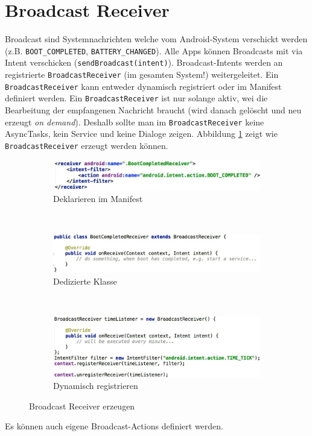 \section{Broadcast Receiver}

Broadcast sind Systemnachrichten welche vom Android-System verschickt werden (z.B. \texttt{BOOT\_COMPLETED}, \texttt{BATTERY\_CHANGED}). Alle Apps können Broadcasts mit via Intent verschicken (\texttt{sendBroadcast(intent)}). Broadcast-Intents werden an registrierte \texttt{BroadcastReceiver} (im gesamten System!) weitergeleitet. Ein \texttt{BroadcastReceiver} kann entweder dynamisch registriert oder im Manifest definiert werden. Ein \texttt{BroadcastReceiver} ist nur solange aktiv, wei die Bearbeitung der empfangenen Nachricht braucht (wird danach gelöscht und neu erzeugt \emph{on demand}). Deshalb sollte man im \texttt{BroadcastReceiver} keine AsyncTasks, kein Service und keine Dialoge zeigen. Abbildung \ref{fig:broadcast-receiver} zeigt wie \texttt{BroadcastReceiver} erzeugt werden können.

\begin{figure}
	\centering
	\begin{subfigure}[b]{0.48\textwidth}
		\includegraphics[width=\textwidth]{fig/broadcast-receiver-manifest}
		\caption{Deklarieren im Manifest}
	\end{subfigure}
	~
	\begin{subfigure}[b]{0.48\textwidth}
		\includegraphics[width=\textwidth]{fig/broadcast-receiver-manifest-klasse}
		\caption{Dedizierte Klasse}
	\end{subfigure}
	~
	\begin{subfigure}[b]{0.48\textwidth}
		\includegraphics[width=\textwidth]{fig/broadcast-receiver-dynamisch}
		\caption{Dynamisch registrieren}
	\end{subfigure}
	\caption{Broadcast Receiver erzeugen}
	\label{fig:broadcast-receiver}
\end{figure}
Es können auch eigene Broadcast-Actions definiert werden.

